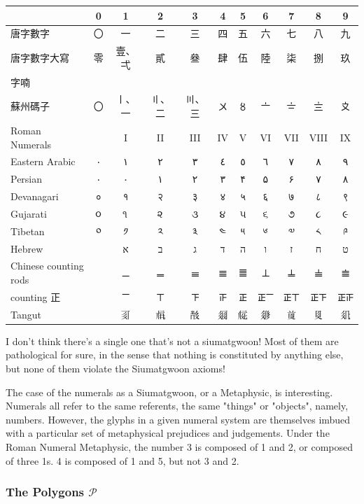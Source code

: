 \begin{center}
\begin{tabular}{|l|c|c|c|c|c|c|c|c|c|c|}
\hline
 & 0 & 1 & 2 & 3 & 4 & 5 & 6 & 7 & 8 & 9 \\
\hline
唐字數字 & 〇 & 一 & 二 & 三 & 四 & 五 & 六 & 七 & 八 & 九 \\
\hline
唐字數字大寫 & 零 & 壹、弌 & 貳 & 叄 & 肆 & 伍 & 陸 & 柒 & 捌 & 玖 \\
\hline
字喃 &  & 𠬠 & 𠄩 & 𠀧 & 𦊚 & 𠄼 & 𦒹 & 𦉱 & 𠔭 & 𠃩 \\
\hline
蘇州碼子 & 〇 & 〡、一 & 〢、二 & 〣、三 & 〤 & 〥 & 〦 & 〧 & 〨 & 〩 \\
\hline
Roman Numerals &  & I & II & III & IV & V & VI & VII & VIII & IX \\
\hline
Eastern Arabic & ٠ & ١ & ٢ & ٣ & ٤ & ٥ & ٦ & ٧ & ٨ & ٩ \\
\hline
Persian & ٠ & ۰ & ۱ & ۲ & ۳ & ۴ & ۵ & ۶ & ۷ & ۸ \\
\hline
Devanagari & ० & १ & २ & ३ & ४ & ५ & ६ & ७ & ८ & ९ \\
\hline
Gujarati & ૦ & ૧ & ૨ & ૩ & ૪ & ૫ & ૬ & ૭ & ૮ & ૯ \\
\hline
Tibetan & ༠ & ༡ & ༢ & ༣ & ༤ & ༥ & ༦ & ༧ & ༨ & ༩ \\
\hline
Hebrew &  & א & ב & ג & ד & ה & ו & ז & ח & ט \\
\hline
Chinese counting rods &  & 𝍠 & 𝍡 & 𝍢 & 𝍣 & 𝍤 & 𝍥 & 𝍦 & 𝍧 & 𝍨 \\
\hline
counting 正 &  & 𝍲 & 𝍳 & 𝍴 & 𝍵 & 𝍶 & 𝍶𝍲 & 𝍶𝍳 & 𝍶𝍴 & 𝍶𝍵 \\
\hline
Tangut &  & 𘈩 & 𗍫 & 𘕕 & 𗥃 & 𗏁 & 𗤁 & 𗒹 & 𘉋 & 𗢭 \\
\hline
\end{tabular}
\end{center}

I don't think there's a single one that's not a siumatgwoon! Most of them are pathological for sure, in the sense that nothing is constituted by anything else, but none of them violate the Siumatgwoon axioms! 

The case of the numerals as a Siumatgwoon, or a Metaphysic, is interesting. Numerals all refer to the same referents, the same "things" or "objects", namely, numbers. However, the glyphs in a given numeral system are themselves imbued with a particular set of metaphysical prejudices and judgements. Under the Roman Numeral Metaphysic, the number 3 is composed of 1 and 2, or composed of three 1s. 4 is composed of 1 and 5, but not 3 and 2. 

\subsubsection{The Polygons $\mathcal{P}$}

